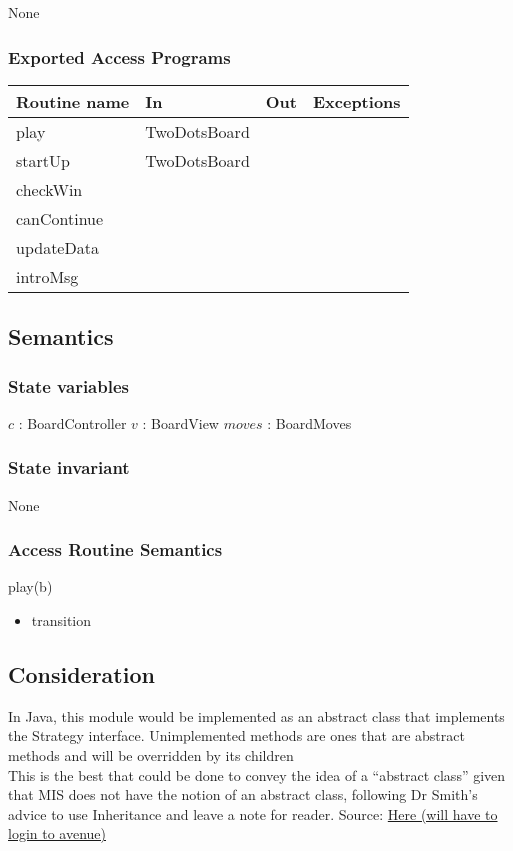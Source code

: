 \documentclass[12pt]{article}
\begin{document}
None

\subsubsection* {Exported Access Programs}

\begin{tabular}{| l | l | l | p{6cm} |}
\hline
\textbf{Routine name} & \textbf{In} & \textbf{Out} & \textbf{Exceptions}\\
\hline
play & TwoDotsBoard & & \\
\hline
startUp & TwoDotsBoard & & \\
\hline
checkWin & & & \\
\hline
canContinue &  & & \\
\hline
updateData &  & & \\
\hline
introMsg & & & \\
\hline
\end{tabular}

\subsection* {Semantics}


\subsubsection* {State variables}
\noindent $c$ : BoardController
\noindent $v$ : BoardView
\noindent $moves$ : BoardMoves


\subsubsection*{State invariant}
\noindent None

\subsubsection* {Access Routine Semantics}

\noindent play(b)
\begin{itemize}
\item transition
\end{itemize}

\subsection* {Consideration}
\noindent In Java, this module would be implemented as an abstract class that implements the Strategy interface. Unimplemented methods are ones that are abstract methods and will be overridden by its children\\
\noindent This is the best that could be done to convey the idea of a ``abstract class'' given that MIS does not have the notion of an abstract class, following Dr Smith's advice to use Inheritance and leave a note for reader. Source: \href{https://avenue.cllmcmaster.ca/d2l/le/296632/discussions/threads/1286234/View?groupFilterOption=0&searchText=abstract} {Here (will have to login to avenue)}
\end{document}

